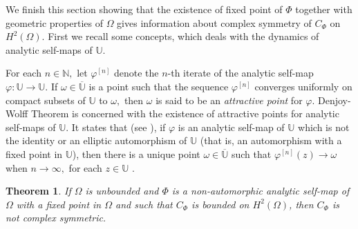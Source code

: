 \documentclass[11pt]{amsart}%
\newtheorem{thm}{Theorem}[section]
\theoremstyle{definition}
\theoremstyle{remark}
\numberwithin{equation}{section}
\begin{document}

We finish this section showing that the existence of fixed point of $\Phi$ together with geometric properties of
$\Omega$ gives information about complex symmetry of $C_{\Phi}$ on $H^{2}(\Omega).$
First we recall some concepts, which deals with the dynamics of analytic self-maps of $\mathbb{U}.$



	For each $n\in\mathbb{N},$ let $\varphi^{[n]}$ denote the $n$-th iterate of the analytic self-map $\varphi:\mathbb{U}\longrightarrow \mathbb{U}.$ If $\omega\in \overline{\mathbb{U}}$ is a point such that the sequence $\varphi^{[n]}$ converges uniformly on compact subsets of $\mathbb{U}$ to $\omega,$ then $\omega$ is said to be an \textit{attractive point} for $\varphi.$ 
		Denjoy-Wolff Theorem is concerned with the existence of attractive points for analytic self-maps of $\mathbb{U}.$ It states that (see \cite[Theorem 2.51]{Cowen-MacClauer}), if $\varphi$ is an analytic self-map of $\mathbb{U}$ which is not the identity or an elliptic automorphism of $\mathbb{U}$ (that is, an automorphism with a fixed point in $\mathbb{U}$), then there is a unique point $\omega\in\overline{\mathbb{U}}$ such that $\varphi^{[n]}(z)\rightarrow \omega$ when $n \rightarrow\infty,$ for each $z\in \mathbb{U}$ .	

\begin{thm}
\label{020}If $\Omega$ is unbounded and $\Phi$ is a non-automorphic analytic
self-map of $\Omega$ with a fixed point in $\Omega$ and
such that $C_{\Phi}$ is bounded on $H^{2}(\Omega)$, then $C_{\Phi}$ is not
complex symmetric.
\end{thm}
\end{document}
